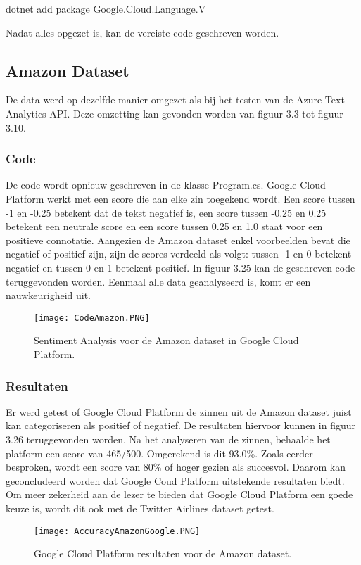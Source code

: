 dotnet add package Google.Cloud.Language.V

Nadat alles opgezet is, kan de vereiste code geschreven worden.


\subsection{Amazon Dataset}
\label{amazongoogleplatform}

De data werd op dezelfde manier omgezet als bij het testen van de Azure Text Analytics API. Deze omzetting kan gevonden worden van figuur 3.3 tot figuur 3.10.

\subsubsection{Code}
\label{amazoncodegoogleplatform}
De code wordt opnieuw geschreven in de klasse Program.cs. Google Cloud Platform werkt met een score die aan elke zin toegekend wordt. Een score tussen -1 en -0.25 betekent dat de tekst negatief is, een score tussen -0.25 en 0.25 betekent een neutrale score en een score tussen 0.25 en 1.0 staat voor een positieve connotatie. Aangezien de Amazon dataset enkel voorbeelden bevat die negatief of positief zijn, zijn de scores verdeeld als volgt: tussen -1 en 0 betekent negatief en tussen 0 en 1 betekent positief. In figuur 3.25 kan de geschreven code teruggevonden worden. Eenmaal alle data geanalyseerd is, komt er een nauwkeurigheid uit. 

\begin{figure}[!htbp]
    \texttt{[image: CodeAmazon.PNG]}
    \caption{\label{codeamazon}Sentiment Analysis voor de Amazon dataset in Google Cloud Platform.}
\end{figure}
\FloatBarrier 

\subsubsection{Resultaten}
\label{amazonresultatengoogleplatform}

Er werd getest of Google Cloud Platform de zinnen uit de Amazon dataset juist kan categoriseren als positief of negatief. De resultaten hiervoor kunnen in figuur 3.26 teruggevonden worden. Na het analyseren van de zinnen, behaalde het platform een score van 465/500. Omgerekend is dit 93.0\%. Zoals eerder besproken, wordt een score van 80\% of hoger gezien als succesvol. Daarom kan geconcludeerd worden dat Google Coud Platform uitstekende resultaten biedt. Om meer zekerheid aan de lezer te bieden dat Google Cloud Platform een goede keuze is, wordt dit ook met de Twitter Airlines dataset getest. 
\begin{figure}[!htbp]
    \texttt{[image: AccuracyAmazonGoogle.PNG]}
    \caption{\label{accuracyTwitter}Google Cloud Platform resultaten voor de Amazon dataset.}
\end{figure}
\FloatBarrier 

